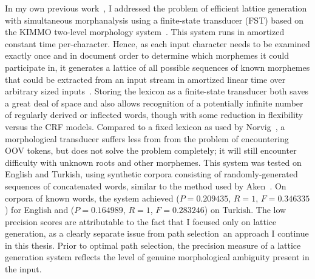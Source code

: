
In my own previous work~\cite{kearsley13}, I addressed the problem of efficient lattice generation with simultaneous morphanalysis using a finite-state transducer (FST) based on the KIMMO two-level morphology system~\cite{koskenniemi84}. This system runs in amortized constant time per-character. Hence, as each input character needs to be examined exactly once and in document order to determine which morphemes it could participate in, it generates a lattice of all possible sequences of known morphemes that could be extracted from an input stream in amortized linear time over arbitrary sized inputs~\cite{kearsley13}. Storing the lexicon as a finite-state transducer both saves a great deal of space and also allows recognition of a potentially infinite number of regularly derived or inflected words, though with some reduction in flexibility versus the CRF models. Compared to a fixed lexicon as used by Norvig~\cite{norvig14}, a morphological transducer suffers less from from the problem of encountering OOV tokens, but does not solve the problem completely; it will still encounter difficulty with unknown roots and other morphemes. This system was tested on English and Turkish, using synthetic corpora consisting of randomly-generated sequences of concatenated words, similar to the method used by Aken~\cite{aken11}. On corpora of known words, the system achieved ($P = 0.209435$, $R = 1$, $F = 0.346335$) for English and ($P = 0.164989$, $R = 1$, $F = 0.283246$) on Turkish.  The low precision scores are attributable to the fact that I focused only on lattice generation, as a clearly separate issue from path selection\textemdash~an approach I continue in this thesis. Prior to optimal path selection, the precision measure of a lattice generation system reflects the level of genuine morphological ambiguity present in the input.

